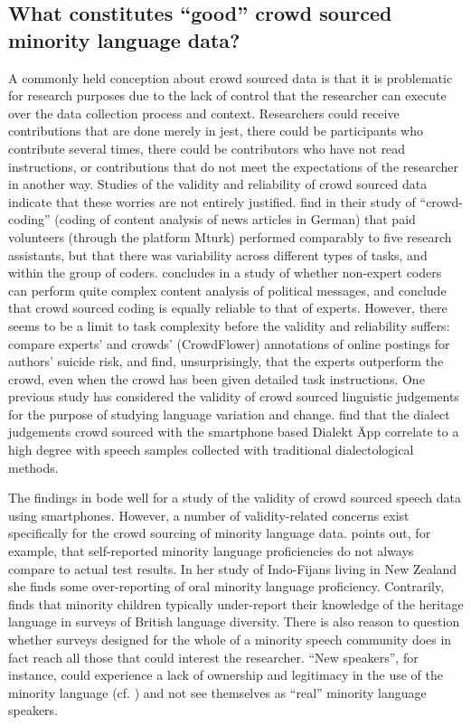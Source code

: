 \documentclass[output=paper,hidelinks]{langscibook}
\begin{document}
\subsection{What constitutes ``good'' crowd sourced minority language data?}

A commonly held conception about crowd sourced data is that it is problematic for research purposes due to the lack of control that the researcher can execute over the data collection process and context. Researchers could receive contributions that are done merely in jest, there could be participants who contribute several times, there could be contributors who have not read instructions, or contributions that do not meet the expectations of the researcher in another way. Studies of the validity and reliability of crowd sourced data indicate that these worries are not entirely justified. \citet{LindEtAl2017} find in their study of “crowd-coding” (coding of content analysis of news articles in German) that paid volunteers (through the platform Mturk) performed comparably to five research assistants, but that there was variability across different types of tasks, and within the group of coders. \citet{Horn2018} concludes in a study of whether non-expert coders can perform quite complex content analysis of political messages, and conclude that crowd sourced coding is equally reliable to that of experts. However, there seems to be a limit to task complexity before the validity and reliability suffers: \citet{ShingEtAl2018} compare experts’ and crowds’ (CrowdFlower) annotations of online postings for authors’ suicide risk, and find, unsurprisingly, that the experts outperform the crowd, even when the crowd has been given detailed task instructions. One previous study has considered the validity of crowd sourced linguistic judgements for the purpose of studying language variation and change. \citet{LeemannEtAl2016} find that the dialect judgements crowd sourced with the smartphone based Dialekt Äpp correlate to a high degree with speech samples collected with traditional dialectological methods. 

The findings in \citet{LeemannEtAl2016} bode well for a study of the validity of crowd sourced speech data using smartphones. However, a number of validity-related concerns exist specifically for the crowd sourcing of minority language data. \citet{Shameen1998} points out, for example, that self-reported minority language proficiencies do not always compare to actual test results. In her study of Indo-Fijans living in New Zealand she finds some over-reporting of oral minority language proficiency. Contrarily, \citet{Nicholas1988} finds that minority children typically under-report their knowledge of the heritage language in surveys of British language diversity. There is also reason to question whether surveys designed for the whole of a minority speech community does in fact reach all those that could interest the researcher. “New speakers”, for instance, could experience a lack of ownership and legitimacy in the use of the minority language (cf. \citealt{ORourkeRamallo2013}) and not see themselves as “real” minority language speakers.
\end{document}
